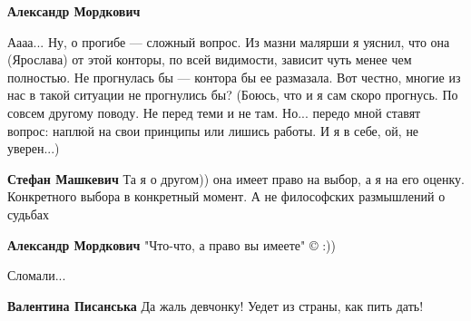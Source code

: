 \begin{itemize}
\begin{itemize}
\textbf{Александр Мордкович} 

\obeycr
Аааа...
Ну, о прогибе — сложный вопрос.
Из мазни малярши я уяснил, что она (Ярослава) от этой конторы, по всей видимости, зависит чуть менее чем полностью.
Не прогнулась бы — контора бы ее размазала.
Вот честно, многие из нас в такой ситуации не прогнулись бы?
(Боюсь, что и я сам скоро прогнусь. По совсем другому поводу. Не перед теми и не там. Но... передо мной ставят вопрос: наплюй на свои принципы или лишись работы. И я в себе, ой, не уверен...)
\restorecr


 
\textbf{Стефан Машкевич} Та я о другом)) она имеет право на выбор, а я на его оценку. Конкретного выбора в конкретный момент. А не философских размышлений о судьбах

 
\textbf{Александр Мордкович} "Что-что, а право вы имеете" © :))

\end{itemize}

 
Сломали...

\begin{itemize}
 
\textbf{Валентина Писанська} Да жаль девчонку! Уедет из страны, как пить дать!
\end{itemize}

 

\end{itemize}
